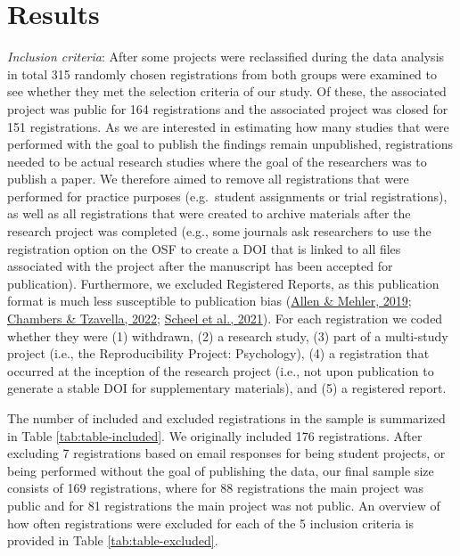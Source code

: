 \documentclass[
  ,jou, a4paper,floatsintext]{apa6}
\begin{document}
\hypertarget{results}{%
\section{Results}\label{results}}

\emph{Inclusion criteria}: After some projects were reclassified during the data analysis in total 315 randomly chosen registrations from both groups were examined to see whether they met the selection criteria of our study. Of these, the associated project was public for 164 registrations and the associated project was closed for 151 registrations. As we are interested in estimating how many studies that were performed with the goal to publish the findings remain unpublished, registrations needed to be actual research studies where the goal of the researchers was to publish a paper. We therefore aimed to remove all registrations that were performed for practice purposes (e.g.~student assignments or trial registrations), as well as all registrations that were created to archive materials after the research project was completed (e.g., some journals ask researchers to use the registration option on the OSF to create a DOI that is linked to all files associated with the project after the manuscript has been accepted for publication). Furthermore, we excluded Registered Reports, as this publication format is much less susceptible to publication bias (\protect\hyperlink{ref-allen_open_2019}{Allen \& Mehler, 2019}; \protect\hyperlink{ref-chambers_past_2022}{Chambers \& Tzavella, 2022}; \protect\hyperlink{ref-scheel_excess_2021}{Scheel et al., 2021}). For each registration we coded whether they were (1) withdrawn, (2) a research study, (3) part of a multi-study project (i.e., the Reproducibility Project: Psychology), (4) a registration that occurred at the inception of the research project (i.e., not upon publication to generate a stable DOI for supplementary materials), and (5) a registered report.

The number of included and excluded registrations in the sample is summarized in Table \ref{tab:table-included}. We originally included 176 registrations. After excluding 7 registrations based on email responses for being student projects, or being performed without the goal of publishing the data, our final sample size consists of 169 registrations, where for 88 registrations the main project was public and for 81 registrations the main project was not public. An overview of how often registrations were excluded for each of the 5 inclusion criteria is provided in Table \ref{tab:table-excluded}.
\end{document}
